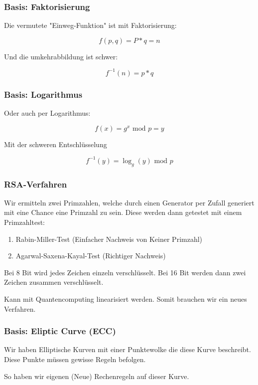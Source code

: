 \documentclass[a4paper]{article}
\begin{document}
\subsubsection{Basis: Faktorisierung}

Die vermutete "Einweg-Funktion" ist mit Faktorisierung:

\[
f(p, q) = P * q = n
\]

Und die umkehrabbildung ist schwer:

\[
f^{-1}(n) = p * q
\]

\subsubsection{Basis: Logarithmus}

Oder auch per Logarithmus:

\[
f(x) = g^x \text{ mod } p = y
\]

Mit der schweren Entschlüsselung

\[
f^{-1}(y) = \log_g(y) \text{ mod } p
\]

\subsubsection{RSA-Verfahren}

Wir ermitteln zwei Primzahlen, welche durch einen Generator per Zufall generiert mit eine Chance eine Primzahl zu sein. Diese werden dann getestet mit einem Primzahltest:

\begin{enumerate}
    \item Rabin-Miller-Test (Einfacher Nachweis von Keiner Primzahl)
    \item Agarwal-Saxena-Kayal-Test (Richtiger Nachweis)
\end{enumerate}

Bei 8 Bit wird jedes Zeichen einzeln verschlüsselt. Bei 16 Bit werden dann zwei Zeichen zusammen verschlüsselt.

Kann mit Quantencomputing linearisiert werden. Somit brauchen wir ein neues Verfahren.

\subsubsection{Basis: Eliptic Curve (ECC)}

Wir haben Elliptische Kurven mit einer Punktewolke die diese Kurve beschreibt. Diese Punkte müssen gewisse Regeln befolgen.

So haben wir eigenen (Neue) Rechenregeln auf dieser Kurve.
\end{document}
